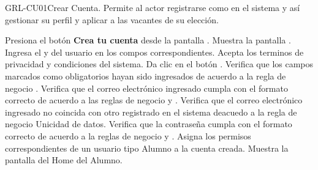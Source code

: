 \begin{UseCase}{GRL-CU01}{Crear Cuenta.}{
	Permite al actor registrarse como en el sistema y así gestionar su perfil y aplicar a las vacantes
	de su elección.
}
	  

\end{UseCase}

\begin{UCtrayectoria}
	\UCpaso [\UCactor] Presiona el botón \textbf{Crea tu cuenta} desde la pantalla .
    \UCpaso [\UCsist] Muestra la pantalla .
	\UCpaso [\UCactor] Ingresa el  y  del usuario en los compos correspondientes.\label{cu01-grl}
	\UCpaso [\UCactor] Acepta los terminos de privacidad y condiciones del sistema.
	\UCpaso [\UCactor] Da clic en el botón . 
    \UCpaso [\UCsist] Verifica que los campos marcados como obligatorios hayan sido ingresados de acuerdo a la
	regla de negocio .
	\UCpaso [\UCsist] Verifica que el correo electrónico ingresado cumpla con el formato correcto de acuerdo a las reglas de negocio   y  .
	\UCpaso [\UCsist] Verifica que el correo electrónico ingresado no coincida con otro registrado en el sistema deacuedo a la regla de negocio   Unicidad de datos.
	\UCpaso [\UCsist] Verifica que la contraseña cumpla con el formato correcto de acuerdo a la reglas de negocio  y  .
	\UCpaso [\UCsist] Asigna los permisos correspondientes de un usuario tipo Alumno a la cuenta creada.
    \UCpaso [\UCsist] Muestra la pantalla del Home del Alumno.
\end{UCtrayectoria}

